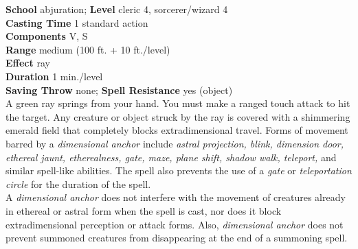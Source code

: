 \textbf{School} abjuration; \textbf{Level} cleric 4, sorcerer/wizard 4\\
\textbf{Casting Time} 1 standard action\\
\textbf{Components} V, S\\
\textbf{Range }medium (100 ft. + 10 ft./level)\\
\textbf{Effect} ray\\
\textbf{Duration} 1 min./level\\
\textbf{Saving Throw} none; \textbf{Spell Resistance} yes (object)\\
A green ray springs from your hand. You must make a ranged touch attack to hit the target. Any creature or object struck by the ray is covered with a shimmering emerald field that completely blocks extradimensional travel. Forms of movement barred by a \textit{dimensional anchor }include \textit{astral projection, blink, dimension door, ethereal jaunt, etherealness, gate, maze, plane shift, shadow walk, teleport, }and similar spell-like abilities. The spell also prevents the use of a \textit{gate }or \textit{teleportation circle }for the duration of the spell.\\
A \textit{dimensional anchor }does not interfere with the movement of creatures already in ethereal or astral form when the spell is cast, nor does it block extradimensional perception or attack forms. Also, \textit{dimensional anchor }does not prevent summoned creatures from disappearing at the end of a summoning spell.\\
